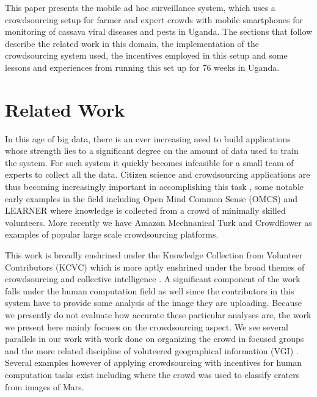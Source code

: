\documentclass[letterpaper]{article} %
\begin{document}
This paper presents the mobile ad hoc surveillance system, which uses a crowdsourcing setup for farmer and expert crowds with mobile smartphones for monitoring of cassava viral diseases and pests in Uganda. The sections that follow describe the related work in this domain, the implementation of the crowdsourcing system used, the incentives employed in this setup and some lessons and experiences from running this set up for 76 weeks in Uganda. 


\section{Related Work}
In this age of big data, there is an ever increasing need to build applications whose strength lies to a significant degree on the amount of data used to train the system. For such system it quickly becomes infeasible for a small team of experts to collect all the data. Citizen science and crowdsourcing applications are thus becoming increasingly important in accomplishing this task \cite{kittur2013future}, some notable early examples in the field including Open Mind Common Sense (OMCS) \cite{singh2002open} and LEARNER \cite{chklovski2003learner} where knowledge is collected from a crowd of minimally skilled volunteers. More recently we have Amazon Mechnanical Turk \cite{paolacci2010running} and Crowdflower \cite{van2012designing} as examples of popular large scale crowdsourcing platforms.

This work is broadly enshrined under the Knowledge Collection from Volunteer Contributors (KCVC) \cite{chklovski2005towards} which is more aptly enshrined under the broad themes of crowdsourcing and collective intelligence \cite{quinn2011human}. A significant component of the work falls under the human computation field as well since the contributors in this system have to provide some analysis of the image they are uploading. Because we presently do not evaluate how accurate these particular analyses are, the work we present here mainly focuses on the crowdsourcing aspect. We see several parallels in our work with work done on organizing the crowd in focused groups \cite{zhu2012organizing} and the more related discipline of voluteered geographical information (VGI) \cite{haklay2013citizen}. Several examples however of applying crowdsourcing with incentives for human computation tasks exist including \cite{kanefsky2001can} where the crowd was used to classify craters from images of Mars.
\end{document}
